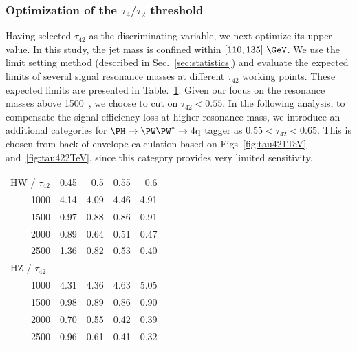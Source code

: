 \clearpage

\subsubsection{Optimization of the $\tau_4/\tau_2$ threshold}
\label{sec:tau42Opti}


Having selected $\tau_{42}$ as the discriminating variable, we next
optimize its upper value.  In this study, the jet mass is confined
within $[110, 135]~\GeV$.  We use the limit setting method (described
in Sec.~\ref{sec:statistics}) and evaluate the expected limits of
several signal resonance masses at different $\tau_{42}$ working
points.  These expected limits are presented
in Table.~\ref{table:tau42Opti}.
Given our focus on the resonance masses above 1500~\GeV, we
choose to cut on $\tau_{42} < 0.55$. In the following analysis, 
to compensate the signal efficiency loss at higher resonance mass, we 
introduce an additional categories for $\Hww$ tagger as $0.55 < \tau_{42} < 0.65$.
This is chosen from back-of-envelope calculation based on 
Figs~\ref{fig:tau421TeV} and~\ref{fig:tau422TeV}, since this category provides 
very limited sensitivity.  

\begin{table}[htbp]
\begin{center}
\label{table:tau42Opti}
\begin{tabular}{|r|r|r|r|r|}
\hline
\multicolumn{1}{|l|}{HW / $\tau_{42}$} & 0.45 & 0.5 & 0.55 & 0.6 \\ 
1000 & 4.14 & 4.09 & 4.46 & 4.91 \\ 
1500 & 0.97 & 0.88 & 0.86 & 0.91 \\ 
2000 & 0.89 & 0.64 & 0.51 & 0.47 \\ 
2500 & 1.36 & 0.82 & 0.53 & 0.40 \\ \hline 
\multicolumn{1}{|l|}{HZ / $\tau_{42}$} & \multicolumn{1}{l|}{} & \multicolumn{1}{l|}{} & \multicolumn{1}{l|}{} & \multicolumn{1}{l|}{} \\ 
1000 & 4.31 & 4.36 & 4.63 & 5.05 \\ 
1500 & 0.98 & 0.89 & 0.86 & 0.90 \\ 
2000 & 0.70 & 0.55 & 0.42 & 0.39 \\ 
2500 & 0.96 & 0.61 & 0.41 & 0.32 \\ \hline
\end{tabular}
\end{center}
\end{table}



